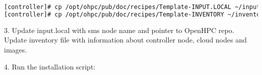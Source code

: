 \begin{lstlisting}[language=bash,keywords={},upquote=true]
[controller]# cp /opt/ohpc/pub/doc/recipes/Template-INPUT.LOCAL ~/input.local
[controller]# cp /opt/ohpc/pub/doc/recipes/Template-INVENTORY ~/inventory
\end{lstlisting}

3. Update input.local with sms node name and pointer to OpenHPC repo. Update inventory file with information about controller node, cloud nodes and images.

4. Run the installation script:
